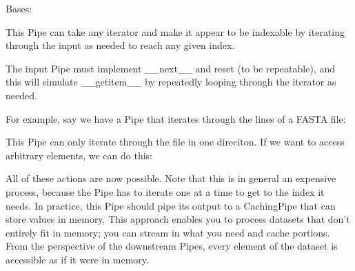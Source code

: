 \documentclass[letterpaper,10pt,english]{sphinxmanual}
\begin{document}
\begin{fulllineitems}
\label{\detokenize{Fireworks:Fireworks.toolbox.pipes.LoopingPipe}}
Bases: {\hyperref[\detokenize{Fireworks:Fireworks.core.pipe.Pipe}]{}}

This Pipe can take any iterator and make it appear to be indexable by iterating through the input
as needed to reach any given index.

The input Pipe must implement \_\_next\_\_ and reset (to be repeatable),
and this will simulate \_\_getitem\_\_ by repeatedly looping through the iterator as needed.

For example, say we have a Pipe that iterates through the lines of a FASTA file:

%
\begin{sphinxVerbatim}[commandchars=\\\{\}]
  
\end{sphinxVerbatim}

This Pipe can only iterate through the file in one direciton. If we want to access arbitrary elements,
we can do this:

%
\begin{sphinxVerbatim}[commandchars=\\\{\}]
  
\PYG{p}{[}\PYG{p}{]}
\PYG{p}{[}\PYG{p}{]}
\end{sphinxVerbatim}

All of these actions are now possible. Note that this is in general an expensive process, because the Pipe
has to iterate one at a time to get to the index it needs. In practice, this Pipe should pipe its output
to a CachingPipe that can store values in memory. This approach enables you to process datasets that don’t
entirely fit in memory; you can stream in what you need and cache portions. From the perspective of the downstream
Pipes, every element of the dataset is accessible as if it were in memory.


\end{fulllineitems}
\end{document}
